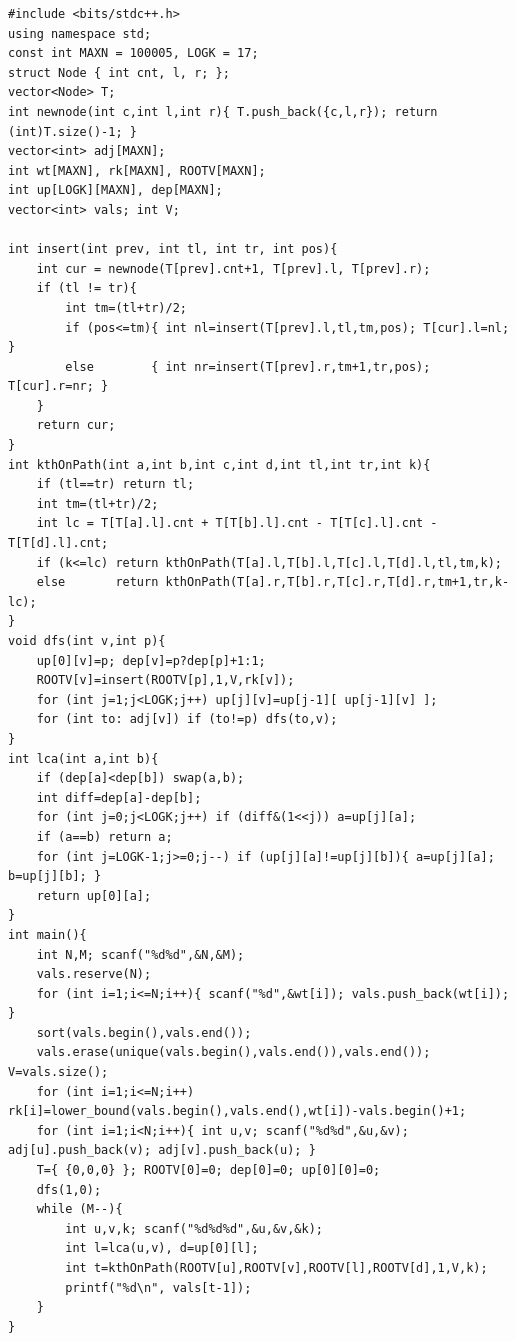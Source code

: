 \begin{lstlisting}[caption={SPOJ COT full solution: per-node chairman roots + Ch.11 LCA, answer each query by a four-root joint descent}, label={lst:c19-cot-soln}]
#include <bits/stdc++.h>
using namespace std;
const int MAXN = 100005, LOGK = 17;
struct Node { int cnt, l, r; };
vector<Node> T;
int newnode(int c,int l,int r){ T.push_back({c,l,r}); return (int)T.size()-1; }
vector<int> adj[MAXN];
int wt[MAXN], rk[MAXN], ROOTV[MAXN];
int up[LOGK][MAXN], dep[MAXN];
vector<int> vals; int V;

int insert(int prev, int tl, int tr, int pos){
    int cur = newnode(T[prev].cnt+1, T[prev].l, T[prev].r);
    if (tl != tr){
        int tm=(tl+tr)/2;
        if (pos<=tm){ int nl=insert(T[prev].l,tl,tm,pos); T[cur].l=nl; }
        else        { int nr=insert(T[prev].r,tm+1,tr,pos); T[cur].r=nr; }
    }
    return cur;
}
int kthOnPath(int a,int b,int c,int d,int tl,int tr,int k){
    if (tl==tr) return tl;
    int tm=(tl+tr)/2;
    int lc = T[T[a].l].cnt + T[T[b].l].cnt - T[T[c].l].cnt - T[T[d].l].cnt;
    if (k<=lc) return kthOnPath(T[a].l,T[b].l,T[c].l,T[d].l,tl,tm,k);
    else       return kthOnPath(T[a].r,T[b].r,T[c].r,T[d].r,tm+1,tr,k-lc);
}
void dfs(int v,int p){
    up[0][v]=p; dep[v]=p?dep[p]+1:1;
    ROOTV[v]=insert(ROOTV[p],1,V,rk[v]);
    for (int j=1;j<LOGK;j++) up[j][v]=up[j-1][ up[j-1][v] ];
    for (int to: adj[v]) if (to!=p) dfs(to,v);
}
int lca(int a,int b){
    if (dep[a]<dep[b]) swap(a,b);
    int diff=dep[a]-dep[b];
    for (int j=0;j<LOGK;j++) if (diff&(1<<j)) a=up[j][a];
    if (a==b) return a;
    for (int j=LOGK-1;j>=0;j--) if (up[j][a]!=up[j][b]){ a=up[j][a]; b=up[j][b]; }
    return up[0][a];
}
int main(){
    int N,M; scanf("%d%d",&N,&M);
    vals.reserve(N);
    for (int i=1;i<=N;i++){ scanf("%d",&wt[i]); vals.push_back(wt[i]); }
    sort(vals.begin(),vals.end());
    vals.erase(unique(vals.begin(),vals.end()),vals.end()); V=vals.size();
    for (int i=1;i<=N;i++) rk[i]=lower_bound(vals.begin(),vals.end(),wt[i])-vals.begin()+1;
    for (int i=1;i<N;i++){ int u,v; scanf("%d%d",&u,&v); adj[u].push_back(v); adj[v].push_back(u); }
    T={ {0,0,0} }; ROOTV[0]=0; dep[0]=0; up[0][0]=0;
    dfs(1,0);
    while (M--){
        int u,v,k; scanf("%d%d%d",&u,&v,&k);
        int l=lca(u,v), d=up[0][l];
        int t=kthOnPath(ROOTV[u],ROOTV[v],ROOTV[l],ROOTV[d],1,V,k);
        printf("%d\n", vals[t-1]);
    }
}
\end{lstlisting}

